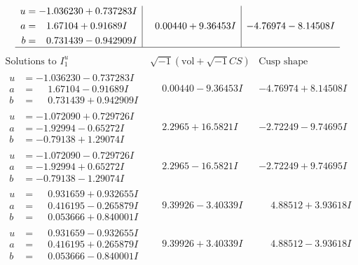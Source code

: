 \documentclass[1p]{elsarticle_modified}
\theoremstyle{definition}
\newcommand{\I}{\sqrt{-1}}
\begin{document}
$$\begin{array}{c|c|c}
\begin{aligned}
u &= -1.036230 + 0.737283 I \\
a &= \phantom{-}1.67104 + 0.91689 I \\
b &= \phantom{-}0.731439 - 0.942909 I\end{aligned}
 & \phantom{-}0.00440 + 9.36453 I & -4.76974 - 8.14508 I\\
 \hline 
 \end{array}$$\newpage$$\begin{array}{c|c|c}  
\text{Solutions to }I^u_{1}& \I (\text{vol} + \sqrt{-1}CS) & \text{Cusp shape}\\
 \hline 
\begin{aligned}
u &= -1.036230 - 0.737283 I \\
a &= \phantom{-}1.67104 - 0.91689 I \\
b &= \phantom{-}0.731439 + 0.942909 I\end{aligned}
 & \phantom{-}0.00440 - 9.36453 I & -4.76974 + 8.14508 I \\ \hline\begin{aligned}
u &= -1.072090 + 0.729726 I \\
a &= -1.92994 - 0.65272 I \\
b &= -0.79138 + 1.29074 I\end{aligned}
 & \phantom{-}2.2965 + 16.5821 I & -2.72249 - 9.74695 I \\ \hline\begin{aligned}
u &= -1.072090 - 0.729726 I \\
a &= -1.92994 + 0.65272 I \\
b &= -0.79138 - 1.29074 I\end{aligned}
 & \phantom{-}2.2965 - 16.5821 I & -2.72249 + 9.74695 I \\ \hline\begin{aligned}
u &= \phantom{-}0.931659 + 0.932655 I \\
a &= \phantom{-}0.416195 - 0.265879 I \\
b &= \phantom{-}0.053666 + 0.840001 I\end{aligned}
 & \phantom{-}9.39926 - 3.40339 I & \phantom{-}4.88512 + 3.93618 I \\ \hline\begin{aligned}
u &= \phantom{-}0.931659 - 0.932655 I \\
a &= \phantom{-}0.416195 + 0.265879 I \\
b &= \phantom{-}0.053666 - 0.840001 I\end{aligned}
 & \phantom{-}9.39926 + 3.40339 I & \phantom{-}4.88512 - 3.93618 I \\ \hline\begin{aligned}

\end{aligned}
\end{array}$$
\end{document}
